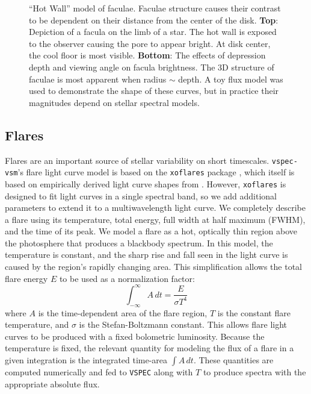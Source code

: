 \documentclass[twocolumn,linenumbers]{aastex631}
\newcommand{\vspec}[1]{\texttt{VSPEC}#1}
\begin{document}
\begin{figure}
    \centering
    \caption{
        ``Hot Wall'' model of faculae. Faculae structure causes their contrast to be dependent on their distance from the center of the disk. {\bf Top}: Depiction of a facula on the limb of a star. The hot wall is exposed to the observer causing the pore to appear bright. At disk center, the cool floor is most visible. {\bf Bottom}: The effects of depression depth and viewing angle on facula brightness. The 3D structure of faculae is most apparent when radius $\sim$ depth. A toy flux model was used to demonstrate the shape of these curves, but in practice their magnitudes depend on stellar spectral models.
        }
    \label{fig:fac_struct}
\end{figure}

\subsection{Flares \label{subsec:flares}}
Flares are an important source of stellar variability on short timescales. \texttt{vspec-vsm}'s flare light curve model is based on the \texttt{xoflares} package \citep{barclay2020}, which itself is based on empirically derived light curve shapes from \citet{davenport2016}. However, \texttt{xoflares} is designed to fit light curves in a single spectral band, so we add additional parameters to extend it to a multiwavelength light curve. We completely describe a flare using its temperature, total energy, full width at half maximum (FWHM), and the time of its peak. We model a flare as a hot, optically thin region above the photosphere that produces a blackbody spectrum. In this model, the temperature is constant, and the sharp rise and fall seen in the light curve is caused by the region's rapidly changing area. This simplification allows the total flare energy $E$ to be used as a normalization factor:
\begin{equation}
    \int_{-\infty}^{\infty}A\,dt = \frac{E}{\sigma T^4}
\end{equation}
where $A$ is the time-dependent area of the flare region, $T$ is the constant flare temperature, and $\sigma$ is the Stefan-Boltzmann constant. This allows flare light curves to be produced with a fixed bolometric luminosity. Because the temperature is fixed, the relevant quantity for modeling the flux of a flare in a given integration is the integrated time-area $\int A\,dt$. These quantities are computed numerically and fed to \vspec{} along with $T$ to produce spectra with the appropriate absolute flux.
\end{document}
